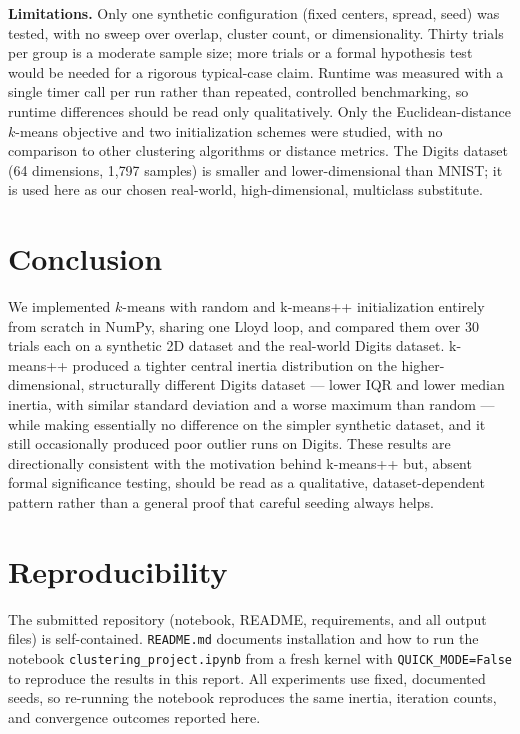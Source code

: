 \documentclass[a4paper,11pt]{article}
\begin{document}
\textbf{Limitations.} Only one synthetic configuration (fixed centers, spread, seed) was
tested, with no sweep over overlap, cluster count, or dimensionality. Thirty trials per group is
a moderate sample size; more trials or a formal hypothesis test would be needed for a
rigorous typical-case claim. Runtime was measured with a single timer call per run rather
than repeated, controlled benchmarking, so runtime differences should be read only
qualitatively. Only the Euclidean-distance $k$-means objective and two initialization schemes
were studied, with no comparison to other clustering algorithms or distance metrics. The
Digits dataset (64 dimensions, 1{,}797 samples) is smaller and lower-dimensional than MNIST;
it is used here as our chosen real-world, high-dimensional, multiclass substitute.

\section{Conclusion}
\label{sec:conclusion}

We implemented $k$-means with random and k-means++ initialization entirely from scratch in
NumPy, sharing one Lloyd loop, and compared them over 30 trials each on a synthetic 2D
dataset and the real-world Digits dataset. k-means++ produced a tighter central inertia
distribution on the higher-dimensional, structurally different Digits dataset --- lower IQR
and lower median inertia, with similar standard deviation and a worse maximum than random
--- while making essentially no difference on the simpler synthetic dataset, and it still
occasionally produced poor outlier runs on Digits. These results are directionally consistent
with the motivation behind k-means++ \cite{arthur2007kmeanspp} but, absent formal
significance testing, should be read as a qualitative, dataset-dependent pattern rather than a
general proof that careful seeding always helps.

\section{Reproducibility}
\label{sec:reproducibility}

The submitted repository (notebook, README, requirements, and all output files) is
self-contained. \texttt{README.md} documents installation and how to run the notebook
\texttt{clustering\_project.ipynb} from a fresh kernel with \texttt{QUICK\_MODE=False} to
reproduce the results in this report. All experiments use fixed, documented seeds, so
re-running the notebook reproduces the same inertia, iteration counts, and convergence
outcomes reported here.
\end{document}
